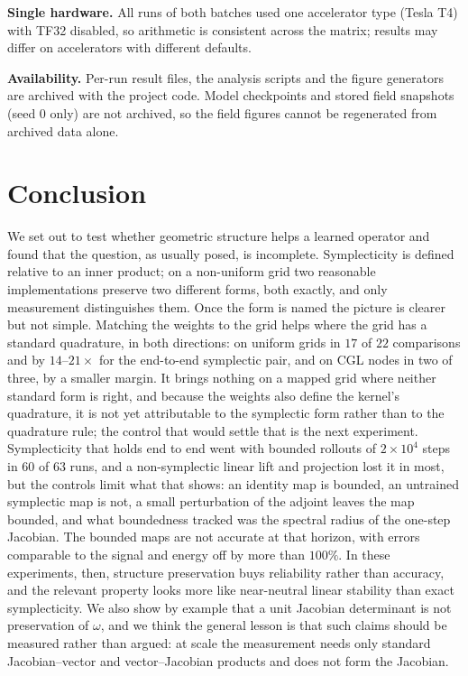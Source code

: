 \documentclass[11pt]{article}
\theoremstyle{definition}
\theoremstyle{remark}
\begin{document}
\textbf{Single hardware.} All runs of both batches used one accelerator type (Tesla T4)
with TF32 disabled, so arithmetic is consistent across the matrix; results may
differ on accelerators with different defaults.

\textbf{Availability.} Per-run result files, the analysis scripts and the figure
generators are archived with the project code. Model checkpoints and stored field
snapshots (seed $0$ only) are not archived, so the field figures cannot be
regenerated from archived data alone.

\section{Conclusion}

We set out to test whether geometric structure helps a learned operator and found
that the question, as usually posed, is incomplete. Symplecticity is defined
relative to an inner product; on a non-uniform grid two reasonable
implementations preserve two different forms, both exactly, and only measurement
distinguishes them. Once the form is named the picture is clearer but not
simple. Matching the weights to the grid helps where the grid has a standard
quadrature, in both directions: on uniform grids in $17$ of $22$ comparisons and
by $14$--$21\times$ for the end-to-end symplectic pair, and on CGL nodes in two of
three, by a smaller margin. It brings nothing on a mapped grid where neither
standard form is right, and because the weights also define the kernel's
quadrature, it is not yet attributable to the symplectic form rather than to the
quadrature rule; the control that would settle that is the next experiment.
Symplecticity that holds end to end went with bounded rollouts of $2\times10^{4}$
steps in $60$ of $63$ runs, and a non-symplectic linear lift and projection
lost it in most, but the controls limit what that shows: an identity map is
bounded, an untrained symplectic map is not, a small perturbation of the adjoint
leaves the map bounded, and what boundedness tracked was the spectral radius of
the one-step Jacobian. The bounded maps are not accurate at that horizon, with
errors comparable to the signal and energy off by more than $100\%$. In these
experiments, then, structure preservation buys reliability rather than accuracy,
and the relevant property looks more like near-neutral linear stability than
exact symplecticity. We also show by example that a unit Jacobian determinant is
not preservation of $\omega$, and we think the general lesson is that such claims
should be measured rather than argued: at scale the measurement needs only
standard Jacobian--vector and vector--Jacobian products and does not form the
Jacobian.
\end{document}
